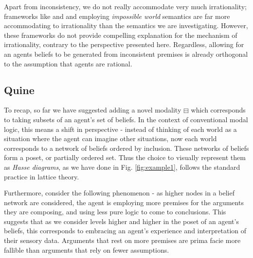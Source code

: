 \documentclass[11pt]{article}
\numberwithin{equation}{subsection}
\newcommand{\BM}{\boxminus}
\begin{document}
Apart from inconsistency, we do not really accommodate very much
irrationality; frameworks like
\citep{rantala_impossible_1982} and and \citet{levesque_logic_1984}
employing \emph{impossible world} semantics are far more accommodating
to irrationality than the semantics we are investigating.  However,
these frameworks do not provide compelling explanation for the
mechanism of irrationality, contrary to the perspective presented
here.  Regardless, allowing for an agents beliefs to be generated from
inconsistent premises is already orthogonal to the assumption that
agents are rational.

\subsection{Quine}\label{quine}
To recap, so far we
have suggested adding a novel modality $\BM$ which corresponds to
taking subsets of an agent's set of beliefs.  In the context of
conventional modal logic, this means a shift in perspective - instead
of thinking of each world as a situation where the agent can imagine
other situations, now each world corresponds to a network of beliefs
ordered by inclusion. These networks of beliefs form a poset, or
partially ordered set.  Thus the choice to visually represent them as
\emph{Hasse diagrams}, as we have done in Fig. \ref{fig:example1}, 
follows the standard practice in lattice theory. 

Furthermore, consider the following phenomenon - as higher
nodes in a belief network are considered, the agent is employing more
premises for the arguments they are composing, and using less pure
logic to come to conclusions.  This suggests that as we consider levels higher and higher in the poset of
an agent's beliefs, this corresponds to embracing an agent's
experience and interpretation of their sensory data.  Arguments
that rest on more premises are prima facie more fallible than
arguments that rely on fewer assumptions.
\end{document}
